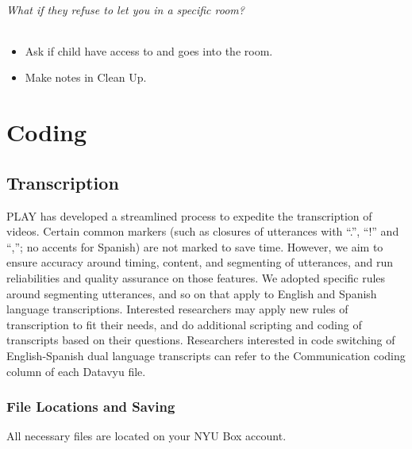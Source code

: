\documentclass[
  12pt,
]{book}
\providecommand{\tightlist}{%
  \setlength{\itemsep}{0pt}\setlength{\parskip}{0pt}}
\begin{document}
\hypertarget{what-if-they-refuse-to-let-you-in-a-specific-room}{%
\paragraph*{What if they refuse to let you in a specific room?}\label{what-if-they-refuse-to-let-you-in-a-specific-room}}

\begin{itemize}
\tightlist
\item
  Ask if child have access to and goes into the room.
\item
  Make notes in Clean Up.
\end{itemize}

\hypertarget{part-coding}{%
\part*{Coding}\label{part-coding}}

\hypertarget{transcription}{%
\chapter{Transcription}\label{transcription}}

PLAY has developed a streamlined process to expedite the transcription of videos. Certain common markers (such as closures of utterances with ``.'', ``!'' and ``,''; no accents for Spanish) are not marked to save time. However, we aim to ensure accuracy around timing, content, and segmenting of utterances, and run reliabilities and quality assurance on those features. We adopted specific rules around segmenting utterances, and so on that apply to English and Spanish language transcriptions. Interested researchers may apply new rules of transcription to fit their needs, and do additional scripting and coding of transcripts based on their questions. Researchers interested in code switching of English-Spanish dual language transcripts can refer to the Communication coding column of each Datavyu file.

\hypertarget{file-locations-and-saving}{%
\section{File Locations and Saving}\label{file-locations-and-saving}}

All necessary files are located on your NYU Box account.
\end{document}
